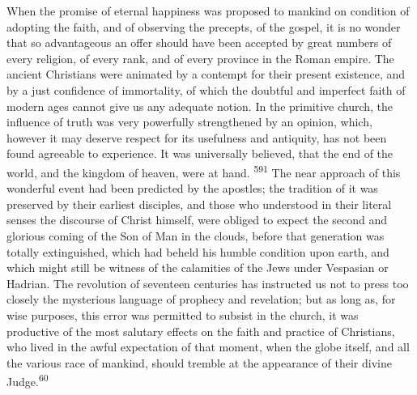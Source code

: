 When the promise of eternal happiness was proposed to mankind on
condition of adopting the faith, and of observing the precepts,
of the gospel, it is no wonder that so advantageous an offer
should have been accepted by great numbers of every religion, of
every rank, and of every province in the Roman empire. The
ancient Christians were animated by a contempt for their present
existence, and by a just confidence of immortality, of which the
doubtful and imperfect faith of modern ages cannot give us any
adequate notion. In the primitive church, the influence of truth
was very powerfully strengthened by an opinion, which, however it
may deserve respect for its usefulness and antiquity, has not
been found agreeable to experience. It was universally believed,
that the end of the world, and the kingdom of heaven, were at
hand. \textsuperscript{591} The near approach of this wonderful event had been
predicted by the apostles; the tradition of it was preserved by
their earliest disciples, and those who understood in their
literal senses the discourse of Christ himself, were obliged to
expect the second and glorious coming of the Son of Man in the
clouds, before that generation was totally extinguished, which
had beheld his humble condition upon earth, and which might still
be witness of the calamities of the Jews under Vespasian or
Hadrian. The revolution of seventeen centuries has instructed us
not to press too closely the mysterious language of prophecy and
revelation; but as long as, for wise purposes, this error was
permitted to subsist in the church, it was productive of the most
salutary effects on the faith and practice of Christians, who
lived in the awful expectation of that moment, when the globe
itself, and all the various race of mankind, should tremble at
the appearance of their divine Judge.\textsuperscript{60}



